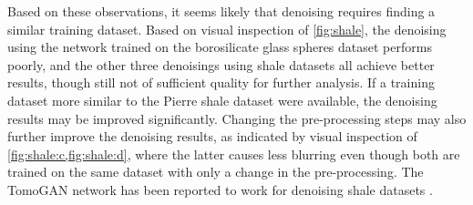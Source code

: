 Based on these observations, it seems likely that denoising requires finding a similar training dataset. Based on visual inspection of \cref{fig:shale}, the denoising using the network trained on the borosilicate glass spheres dataset performs poorly, and the other three denoisings using shale datasets all achieve better results, though still not of sufficient quality for further analysis. If a training dataset more similar to the Pierre shale dataset were available, the denoising results may be improved significantly. Changing the pre-processing steps may also further improve the denoising results, as indicated by visual inspection of \cref{fig:shale:c,fig:shale:d}, where the latter causes less blurring even though both are trained on the same dataset with only a change in the pre-processing. The TomoGAN network has been reported to work for denoising shale datasets \cite{liu2020tomogan}. 